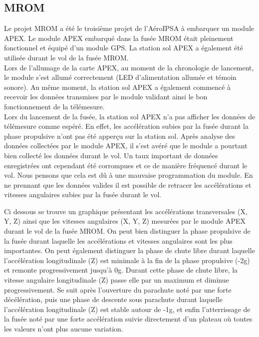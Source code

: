 \documentclass{article}
\begin{document}
\subsection{MROM}

Le projet MROM a été le troisième projet de l'AéroIPSA à embarquer un module APEX. Le
module APEX embarqué dans la fusée MROM était pleinement fonctionnel et équipé d'un
module GPS. La station sol APEX a également été utilisée durant le vol de la fusée MROM.\\

Lors de l'allumage de la carte APEX, au moment de la chronologie de lancement, le module
s'est allumé correctement (LED d'alimentation allumée et témoin sonore). Au même moment,
la station sol APEX a également commencé à recevoir les données transmises par le module
validant ainsi le bon fonctionnement de la télémesure.\\

Lors du lancement de la fusée, la station sol APEX n'a pas afficher les données de
télémesure comme espéré. En effet, les accélération subies par la fusée durant la
phase propulsive n'ont pas été apperçu sur la station sol. Après analyse des données
collectées par le module APEX, il s'est avéré que le module a pourtant bien collecté
les données durant le vol. Un taux important de données enregistrées ont cependant été
corrompues et ce de manière fréquencé durant le vol. Nous pensons que cela est dû à une
mauvaise programmation du module. En ne prennant que les données valides il est possible
de retracer les accélérations et vitesses angulaires subies par la fusée durant le vol.\\

\newpage

Ci dessous se trouve un graphique présentant les accélérations transversales (X, Y, Z) ainsi
que les vitesses angulaires (X, Y, Z) mesurées par le module APEX durant le vol de la
fusée MROM. On peut bien distinguer la phase propulsive de la fusée durant laquelle les
accélérations et vitesses angulaires sont les plus importantes. On peut également distinguer
la phase de chute libre durant laquelle l'accélération longitudinale (Z) est minimale à la fin
de la phase propulsive (-2g) et remonte progressivement jusqu'à 0g. Durant cette phase de
chute libre, la vitesse angulaire longitudinale (Z) passe elle par un maximum et diminue
progressivement. Se suit après l'ouverture du parachute noté par une forte décélération, puis
une phase de descente sous parachute durant laquelle l'accélération longitudinale (Z) est
stable autour de -1g, et enfin l'atterrissage de la fusée noté par une forte accélération
suivie directement d'un plateau où toutes les valeurs n'ont plus aucune variation.
\end{document}
